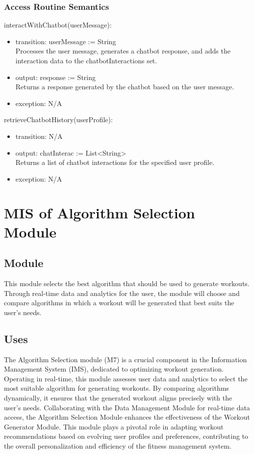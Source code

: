 \documentclass[12pt, titlepage]{article}
\begin{document}
\subsubsection{Access Routine Semantics}

\noindent interactWithChatbot(userMessage):
\begin{itemize}
\item transition: userMessage := String \\
Processes the user message, generates a chatbot response, and adds the interaction data to the chatbotInteractions set.
\item output: response := String\\
Returns a response generated by the chatbot based on the user message.
\item exception: N/A
\end{itemize}

\noindent retrieveChatbotHistory(userProfile):
\begin{itemize}
\item transition: N/A
\item output: chatInterac := List\textless String\textgreater \\
Returns a list of chatbot interactions for the specified user profile.
\item exception: N/A
\end{itemize}


\section{MIS of Algorithm Selection Module}


\subsection{Module}
This module selects the best algorithm that should be used to generate workouts. Through real-time data and analytics for the user, the module will choose and compare algorithms in which a workout will be generated that best suits the user's needs. 

\subsection{Uses}
The Algorithm Selection module (M7) is a crucial component in the Information Management System (IMS), dedicated to optimizing workout generation. Operating in real-time, this module assesses user data and analytics to select the most suitable algorithm for generating workouts. By comparing algorithms dynamically, it ensures that the generated workout aligns precisely with the user's needs. Collaborating with the Data Management Module for real-time data access, the Algorithm Selection Module enhances the effectiveness of the Workout Generator Module. This module plays a pivotal role in adapting workout recommendations based on evolving user profiles and preferences, contributing to the overall personalization and efficiency of the fitness management system.
\end{document}
